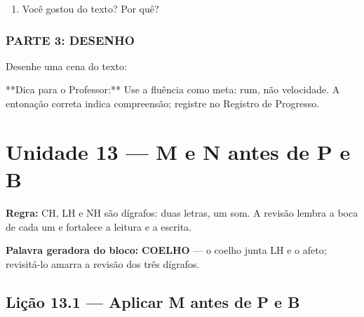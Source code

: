 \begin{exercicio}
\begin{enumerate}
  \item Você gostou do texto? Por quê?
  \begin{center}
  \underline{\hspace{12cm}}
  \end{center}

\end{enumerate}

\subsection*{PARTE 3: DESENHO}

Desenhe uma cena do texto:

\begin{center}
\end{center}

\end{exercicio}

\begin{dica}
**Dica para o Professor:** Use a fluência como meta: rum, não velocidade. A entonação correta indica compreensão; registre no Registro de Progresso.
\end{dica}


\chapter{Unidade 13 --- M e N antes de P e B}


\textbf{Regra:} CH, LH e NH são dígrafos: duas letras, um som. A revisão lembra a boca de cada um e fortalece a leitura e a escrita.

\textbf{Palavra geradora do bloco:} \textbf{COELHO} --- o coelho junta LH e o afeto; revisitá-lo amarra a revisão dos três dígrafos.

\section{Lição 13.1 --- Aplicar M antes de P e B}

